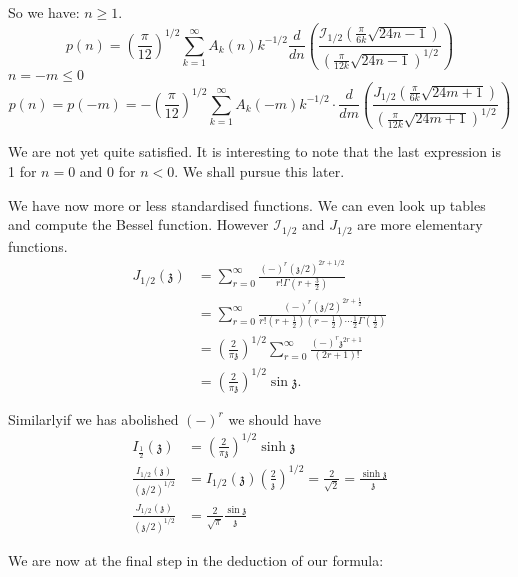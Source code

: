 So we have: \qquad $n \geq 1$.
$$
p(n) = \left(\frac{\pi}{12} \right)^{1/2} \sum^\infty_{k=1} A_k (n)
k^{-1/2} \frac{d}{dn} \left(\frac{\mathcal{I}_{1/2} \left(
  \frac{\pi}{6k} \sqrt{24 n-1}\right)}{\left( \frac{\pi}{12k} \sqrt{24
    n-1}\right)^{1/2}} \right)
$$
$n= -m \leq 0$\pageoriginale
$$
p(n) = p(-m)= - \left( \frac{\pi}{12}\right)^{1/2} \sum^\infty_{k=1}
A_k (-m) k^{-1/2} \cdot \frac{d}{dm} \left( \frac{J_{1/2}
  \left( \frac{\pi}{6k} \sqrt{24m+1}\right)}{\left( \frac{\pi}{12k}
  \sqrt{24 m+1}\right)^{1/2}}\right) 
$$

We are not yet quite satisfied. It is interesting to note that the
last expression is 1 for $n=0$ and 0 for $n< 0$. We shall pursue this
later.

We have now more or less standardised functions. We can even look up
tables and compute the Bessel function. However $\mathcal{I}_{1/2}$
and $J_{1/2}$ are more elementary functions.
\begin{align*}
  J_{1/2} (\mathfrak{z}) & = \sum^\infty_{r=0} \frac{(-)^r
    (\mathfrak{z}/2)^{2r+ 1/2}}{r! \Gamma (r + \frac{3}{2})}\\
  & = \sum^\infty_{r=0} \frac{(-)^r (\mathfrak{z}/2)^{2r +
      \frac{1}{2}}}{r! \left( r + \frac{1}{2}\right) \left( r -
    \frac{1}{2} \right) \cdots \frac{1}{2} \Gamma\left(
    \frac{1}{2}\right)}\\
    & = \left( \frac{2}{\pi \mathfrak{z}}\right)^{1/2}
    \sum^\infty_{r=0} \frac{(-)^r \mathfrak{z}^{2r+1}}{(2r+1)!}\\
    & = \left( \frac{2}{\pi \mathfrak{z}}\right)^{1/2} \sin \mathfrak{z}.
\end{align*}

Similarly\pageoriginale if we has abolished $(-)^r$ we should have
\begin{align*}
  I_{\frac{1}{2}} (\mathfrak{z})& = \left( \frac{2}{\pi
    \mathfrak{z}}\right)^{1/2} \sinh \mathfrak{z}\\
  \frac{I_{1/2} (\mathfrak{z})}{(\mathfrak{z}/2)^{1/2}} & = I_{1/2}
  (\mathfrak{z}) \left( \frac{2}{\mathfrak{z}}\right)^{1/2} =
  \frac{2}{\sqrt{2}} = \frac{\sinh \mathfrak{z}}{\mathfrak{z}}\\
  \frac{J_{1/2} (\mathfrak{z})}{(\mathfrak{z}/2)^{1/2}} & =
  \frac{2}{\sqrt{\pi}}  \frac{\sin \mathfrak{z}}{\mathfrak{z}}
\end{align*}

We are now at the final step in the deduction of our formula: 


